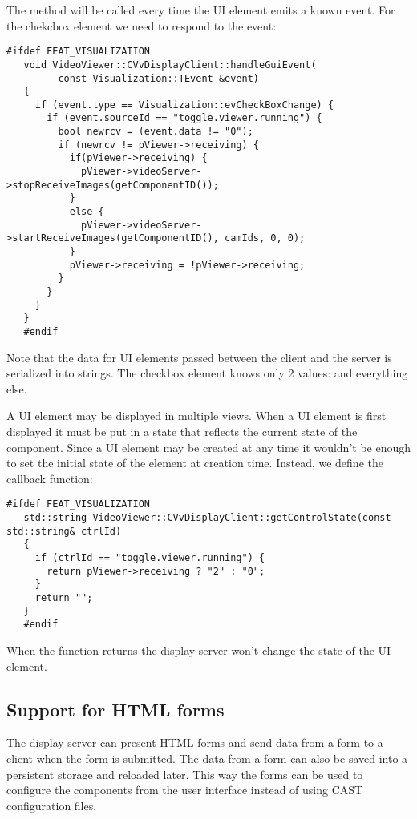 The method  will be called every time the UI element
emits a known event. For the chekcbox element we need to respond to the
 event:

\begin{Verbatim}[fontsize=\scriptsize,gobble=3]
   #ifdef FEAT_VISUALIZATION
   void VideoViewer::CVvDisplayClient::handleGuiEvent(
         const Visualization::TEvent &event)
   {
     if (event.type == Visualization::evCheckBoxChange) {
       if (event.sourceId == "toggle.viewer.running") {
         bool newrcv = (event.data != "0");
         if (newrcv != pViewer->receiving) {
           if(pViewer->receiving) {
             pViewer->videoServer->stopReceiveImages(getComponentID());
           }
           else {
             pViewer->videoServer->startReceiveImages(getComponentID(), camIds, 0, 0);
           }
           pViewer->receiving = !pViewer->receiving;
         }
       }
     }
   }
   #endif
\end{Verbatim}

Note that the data for UI elements passed between the client and the server is
serialized into strings. The checkbox element knows only 2 values: 
and everything else.

A UI element may be displayed in multiple views. When a UI element is first
displayed it must be put in a state that reflects the current state of the
component.  Since a UI element may be created at any time it wouldn't be enough
to set the initial state of the element at creation time. Instead, we define
the  callback function:

\begin{Verbatim}[fontsize=\scriptsize,gobble=3]
   #ifdef FEAT_VISUALIZATION
   std::string VideoViewer::CVvDisplayClient::getControlState(const std::string& ctrlId)
   {
     if (ctrlId == "toggle.viewer.running") {
       return pViewer->receiving ? "2" : "0";
     }
     return "";
   }
   #endif
\end{Verbatim}

When the function returns  the display server won't change the state
of the UI element.

\subsection{Support for HTML forms}\label{section:HtmlForms}

The display server can present HTML forms and send data from a form to a client
when the form is submitted. The data from a form can also be saved into a
persistent storage and reloaded later. This way the forms can be used to
configure the components from the user interface instead of using CAST
configuration files.

